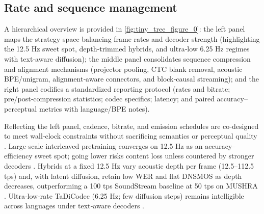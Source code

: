 \documentclass{article}
\begin{document}
\subsection{Rate and sequence management} \label{subsec:Rate and sequence management}
A hierarchical overview is provided in \autoref{fig:tiny_tree_figure_0}: the left panel maps the strategy space balancing frame rates and decoder strength (highlighting the 12.5 Hz sweet spot, depth‑trimmed hybrids, and ultra‑low 6.25 Hz regimes with text‑aware diffusion); the middle panel consolidates sequence compression and alignment mechanisms (projector pooling, CTC blank removal, acoustic BPE/unigram, alignment‑aware connectors, and block‑causal streaming); and the right panel codifies a standardized reporting protocol (rates and bitrate; pre/post‑compression statistics; codec specifics; latency; and paired accuracy–perceptual metrics with language/BPE notes).

Reflecting the left panel, cadence, bitrate, and emission schedules are co‑designed to meet wall‑clock constraints without sacrificing semantics or perceptual quality \cite{zhao2024textlessstreamingspeechtranslationsemant,liu2024analyzingmitigatinginconsistencydiscrete,zhang2025impactframeratesspeechtokenizercasestudy,huang2024repcodecspeechrepresentationcodectokeniz}. Large‑scale interleaved pretraining converges on 12.5 Hz as an accuracy–efficiency sweet spot; going lower risks content loss unless countered by stronger decoders \cite{zeng2024scalingspeechtextpretrainingsyntheticint}. Hybrids at a fixed 12.5 Hz vary acoustic depth per frame (12.5–112.5 tps) and, with latent diffusion, retain low WER and flat DNSMOS as depth decreases, outperforming a 100 tps SoundStream baseline at 50 tps on MUSHRA \cite{yang2025diffsoundstreamefficientspeechtokenizati}. Ultra‑low‑rate TaDiCodec (6.25 Hz; few diffusion steps) remains intelligible across languages under text‑aware decoders \cite{wang2025tadicodectextawarediffusionspeechtokeniz}.
\end{document}
